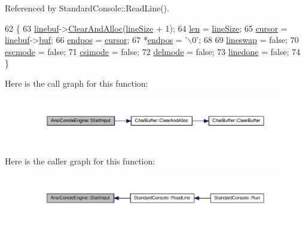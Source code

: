 Referenced by Standard\+Console\+::\+Read\+Line().


\begin{DoxyCode}
62 \{
63     \hyperlink{classAnsiConoleEngine_a6bf88afa72a458e3687972f9e666cd86}{linebuf}->\hyperlink{classCharBuffer_a8c0927c2c05c954161151045f68581c6}{ClearAndAlloc}(\hyperlink{classAnsiConoleEngine_a59042210f69050bdfb531841e8ac0927}{lineSize} + 1);
64     \hyperlink{classAnsiConoleEngine_ad5d65280df848947f5b2dda80dcf35c6}{len} = \hyperlink{classAnsiConoleEngine_a59042210f69050bdfb531841e8ac0927}{lineSize};
65     \hyperlink{classAnsiConoleEngine_aea3df1b13bc8ecf2eb68ec693249800f}{cursor} = \hyperlink{classAnsiConoleEngine_a6bf88afa72a458e3687972f9e666cd86}{linebuf}->\hyperlink{classCharBuffer_a8bcd8491b24db4197b311eb361609674}{buf};
66     \hyperlink{classAnsiConoleEngine_a28852245082570631c7392411fec89cc}{endpos} = \hyperlink{classAnsiConoleEngine_aea3df1b13bc8ecf2eb68ec693249800f}{cursor};
67     *\hyperlink{classAnsiConoleEngine_a28852245082570631c7392411fec89cc}{endpos} = \textcolor{charliteral}{'\(\backslash\)0'};
68 
69     \hyperlink{classAnsiConoleEngine_a23b1b0d4714995d12e7b0aacdecfa0c4}{lineswap} = \textcolor{keyword}{false};
70     \hyperlink{classAnsiConoleEngine_af497f5cbdca8bbc350935a90568b06e7}{escmode} = \textcolor{keyword}{false};
71     \hyperlink{classAnsiConoleEngine_adf2036857a6c6de85836ee2e7b3e5d6d}{csimode} = \textcolor{keyword}{false};
72     \hyperlink{classAnsiConoleEngine_a5182d9a19cc1fe8681a9faf77a156657}{delmode} = \textcolor{keyword}{false};
73     \hyperlink{classAnsiConoleEngine_a0931686f3224f07bd3a3fe25c06e32c6}{linedone} = \textcolor{keyword}{false};
74 \}
\end{DoxyCode}


Here is the call graph for this function\+:
\nopagebreak
\begin{figure}[H]
\begin{center}
\leavevmode
\includegraphics[width=350pt]{df/d87/classAnsiConoleEngine_a8ad01a2ddd3ee5182deb4a74f3d2a0c1_cgraph}
\end{center}
\end{figure}




Here is the caller graph for this function\+:
\nopagebreak
\begin{figure}[H]
\begin{center}
\leavevmode
\includegraphics[width=350pt]{df/d87/classAnsiConoleEngine_a8ad01a2ddd3ee5182deb4a74f3d2a0c1_icgraph}
\end{center}
\end{figure}




